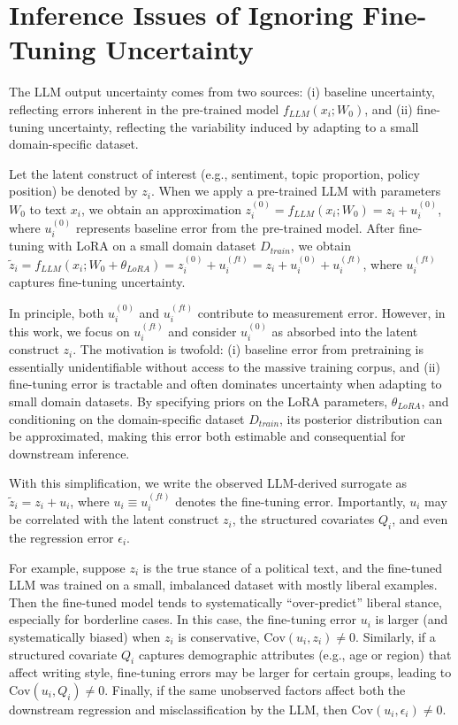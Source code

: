 \documentclass[11pt]{article}
\begin{document}
\newpage
\appendix

\section{Inference Issues of Ignoring Fine-Tuning Uncertainty}
\label{appendix:llm_inference}

The LLM output uncertainty comes from two sources: (i) baseline uncertainty, reflecting errors inherent in the pre-trained model $f_{LLM}(x_i; W_0)$, and (ii) fine-tuning uncertainty, reflecting the variability induced by adapting to a small domain-specific dataset.

Let the latent construct of interest (e.g., sentiment, topic proportion, policy position) be denoted by $z_i$. When we apply a pre-trained LLM with parameters $W_0$ to text $x_i$, we obtain an approximation $z_i^{(0)} = f_{LLM}(x_i; W_0) = z_i + u_i^{(0)}$, where $u_i^{(0)}$ represents baseline error from the pre-trained model. After fine-tuning with LoRA on a small domain dataset $D_{train}$, we obtain $\tilde{z}_i = f_{LLM}(x_i; W_0 + \theta_{LoRA}) = z_i^{(0)} + u_i^{(ft)} = z_i + u_i^{(0)} + u_i^{(ft)}$, where $u_i^{(ft)}$ captures fine-tuning uncertainty.

In principle, both $u_i^{(0)}$ and $u_i^{(ft)}$ contribute to measurement error. However, in this work, we focus on $u_i^{(ft)}$ and consider $u_i^{(0)}$ as absorbed into the latent construct $z_i$. The motivation is twofold: (i) baseline error from pretraining is essentially unidentifiable without access to the massive training corpus, and (ii) fine-tuning error is tractable and often dominates uncertainty when adapting to small domain datasets. By specifying priors on the LoRA parameters, $\theta_{LoRA}$, and conditioning on the domain-specific dataset $D_{train}$, its posterior distribution can be approximated, making this error both estimable and consequential for downstream inference.

With this simplification, we write the observed LLM-derived surrogate as $\tilde{z}_i = z_i + u_i$, where $u_i \equiv u_i^{(ft)}$ denotes the fine-tuning error. Importantly, $u_i$ may be correlated with the latent construct $z_i$, the structured covariates $Q_i$, and even the regression error $\epsilon_i$.

For example, suppose $z_i$ is the true stance of a political text, and the fine-tuned LLM was trained on a small, imbalanced dataset with mostly liberal examples. Then the fine-tuned model tends to systematically ``over-predict'' liberal stance, especially for borderline cases. In this case, the fine-tuning error $u_i$ is larger (and systematically biased) when $z_i$ is conservative, $\text{Cov}(u_i, z_i) \neq 0$. Similarly, if a structured covariate $Q_i$ captures demographic attributes (e.g., age or region) that affect writing style, fine-tuning errors may be larger for certain groups, leading to $\text{Cov}(u_i, Q_i) \neq 0$. Finally, if the same unobserved factors affect both the downstream regression and misclassification by the LLM, then $\text{Cov}(u_i, \epsilon_i) \neq 0$.
\end{document}
